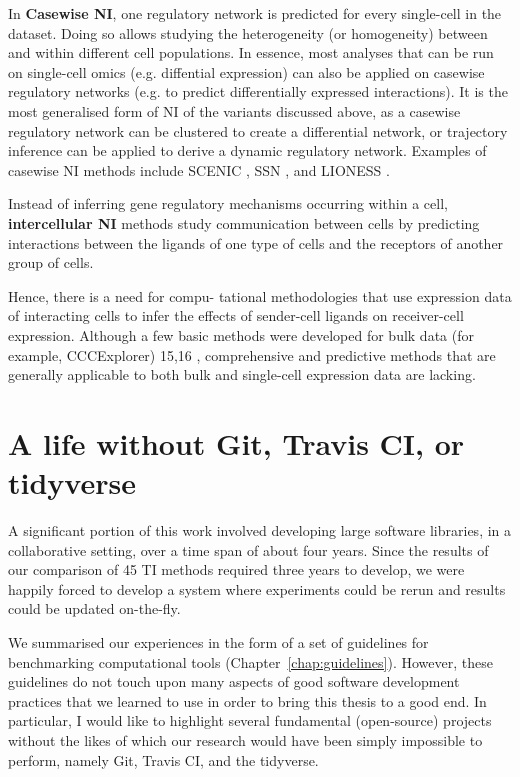 In \textbf{Casewise NI}, one regulatory network is predicted for every single-cell in the dataset. Doing so allows studying the heterogeneity (or homogeneity) between and within different cell populations. In essence, most analyses that can be run on single-cell omics (e.g. diffential expression) can also be applied on casewise regulatory networks (e.g. to predict differentially expressed interactions).
It is the most generalised form of NI of the variants discussed above, as a casewise regulatory network can be clustered to create a differential network, or trajectory inference can be applied to derive a dynamic regulatory network. Examples of casewise NI methods include SCENIC \cite{aibar_scenicsinglecellregulatory_2017}, SSN \cite{liu_personalizedcharacterizationdiseases_2016}, and LIONESS \cite{kuijjer_estimatingsamplespecificregulatory_2019}.


Instead of inferring gene regulatory mechanisms occurring within a cell, \textbf{intercellular NI} methods study communication between cells by predicting interactions between the ligands of one type of cells and the receptors of another group of cells. 



Hence, there is a need for compu-
tational methodologies that use expression data of interacting cells
to infer the effects of sender-cell ligands on receiver-cell expression.
Although a few basic methods were developed for bulk data (for
example, CCCExplorer) 15,16 , comprehensive and predictive methods
that are generally applicable to both bulk and single-cell expression
data are lacking.





\section{A life without Git, Travis CI, or tidyverse}
A significant portion of this work involved developing large software libraries, in a collaborative setting, over a time span of about four years. Since the results of our comparison of 45 TI methods required three years to develop, we were happily forced to develop a system where experiments could be rerun and results could be updated on-the-fly.

We summarised our experiences in the form of a set of guidelines for benchmarking computational tools (Chapter~\ref{chap:guidelines}). However, these guidelines do not touch upon many aspects of good software development practices that we learned to use in order to bring this thesis to a good end. In particular, I would like to highlight several  fundamental (open-source) projects without the likes of which our research would have been simply impossible to perform, namely Git, Travis CI, and the tidyverse.


